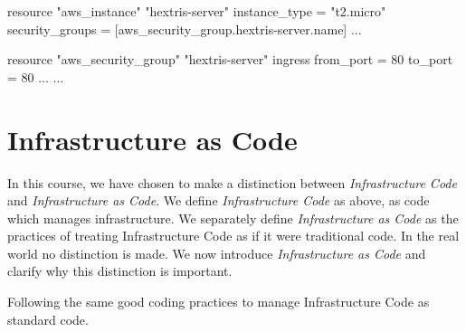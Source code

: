 \begin{code}[language=terraform]{}
resource "aws_instance" "hextris-server" {
    instance_type = "t2.micro"
    security_groups = [aws_security_group.hextris-server.name]
    ...
}

resource "aws_security_group" "hextris-server" {
    ingress {
        from_port = 80
        to_port = 80
        ...
    }
    ...
}
\end{code}

  
  


\section{Infrastructure as Code}

In this course, we have chosen to make a distinction between \textsl{Infrastructure Code} and \textsl{Infrastructure as Code}.
We define \textsl{Infrastructure Code} as above,
as code which manages infrastructure.
We separately define \textsl{Infrastructure as Code} as the practices of treating Infrastructure Code as if it were traditional code.
In the real world no distinction is made.
We now introduce \textsl{Infrastructure as Code} and clarify why this distinction is important.

\begin{definition}
Following the same good coding practices to manage Infrastructure Code as standard code.
\end{definition}

